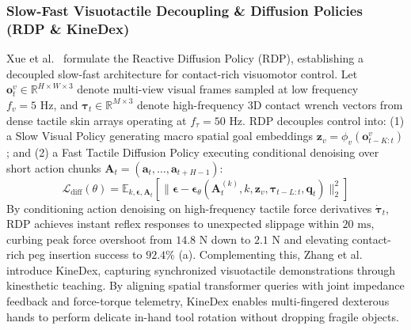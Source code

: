 \subsubsection{Slow-Fast Visuotactile Decoupling \& Diffusion Policies (RDP \& KineDex)}
Xue et al.~\cite{Xue2025RDP} formulate the Reactive Diffusion Policy (RDP), establishing a decoupled slow-fast architecture for contact-rich visuomotor control. Let $\mathbf{o}_t^v \in \mathbb{R}^{H \times W \times 3}$ denote multi-view visual frames sampled at low frequency $f_v = 5\text{ Hz}$, and $\mathbf{\tau}_t \in \mathbb{R}^{M \times 3}$ denote high-frequency 3D contact wrench vectors from dense tactile skin arrays operating at $f_\tau = 50\text{ Hz}$. RDP decouples control into: (1) a Slow Visual Policy generating macro spatial goal embeddings $\mathbf{z}_v = \phi_v(\mathbf{o}_{t-K:t}^v)$; and (2) a Fast Tactile Diffusion Policy executing conditional denoising over short action chunks $\mathbf{A}_t = (\mathbf{a}_t, \dots, \mathbf{a}_{t+H-1})$:
\begin{equation}
    \mathcal{L}_{\text{diff}}(\theta) = \mathbb{E}_{k, \mathbf{\epsilon}, \mathbf{A}_t} \left[ \|\mathbf{\epsilon} - \mathbf{\epsilon}_\theta(\mathbf{A}_t^{(k)}, k, \mathbf{z}_v, \mathbf{\tau}_{t-L:t}, \mathbf{q}_t)\|_2^2 \right]
\end{equation}
By conditioning action denoising on high-frequency tactile force derivatives $\dot{\mathbf{\tau}}_t$, RDP achieves instant reflex responses to unexpected slippage within $20\text{ ms}$, curbing peak force overshoot from $14.8\text{ N}$ down to $2.1\text{ N}$ and elevating contact-rich peg insertion success to $92.4\%$ (a). Complementing this, Zhang et al.~\cite{Zhang2025KineDex} introduce KineDex, capturing synchronized visuotactile demonstrations through kinesthetic teaching. By aligning spatial transformer queries with joint impedance feedback and force-torque telemetry, KineDex enables multi-fingered dexterous hands to perform delicate in-hand tool rotation without dropping fragile objects.

